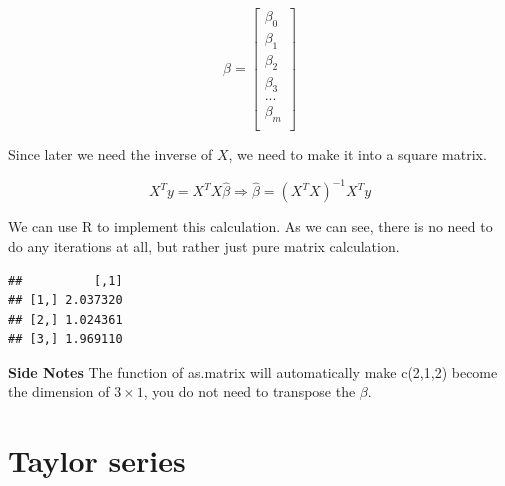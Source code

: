\documentclass[]{book}
\newenvironment{Shaded}{\begin{snugshade}}{\end{snugshade}}
\newcommand{\CommentTok}[1]{\textcolor[rgb]{0.56,0.35,0.01}{\textit{#1}}}
\newcommand{\DataTypeTok}[1]{\textcolor[rgb]{0.13,0.29,0.53}{#1}}
\newcommand{\DecValTok}[1]{\textcolor[rgb]{0.00,0.00,0.81}{#1}}
\newcommand{\KeywordTok}[1]{\textcolor[rgb]{0.13,0.29,0.53}{\textbf{#1}}}
\newcommand{\NormalTok}[1]{#1}
\newcommand{\OperatorTok}[1]{\textcolor[rgb]{0.81,0.36,0.00}{\textbf{#1}}}
\begin{document}
\[\beta = \begin{bmatrix}\beta_0 \\
\beta_1 \\
\beta_2 \\
\beta_3 \\
...\\
\beta_m \\
\end{bmatrix}\]

Since later we need the inverse of \(X\), we need to make it into a square matrix.

\[X^Ty=X^TX \hat{\beta} \Rightarrow \hat{\beta} = (X^TX)^{-1} X^Ty\]

We can use R to implement this calculation. As we can see, there is no need to do any iterations at all, but rather just pure matrix calculation.

\begin{Shaded}
\end{Shaded}

\begin{verbatim}
##          [,1]
## [1,] 2.037320
## [2,] 1.024361
## [3,] 1.969110
\end{verbatim}

\textbf{Side Notes}
The function of as.matrix will automatically make c(2,1,2) become the dimension of \(3 \times 1\), you do not need to transpose the \(\beta\).

\hypertarget{taylor-series}{%
\section{Taylor series}\label{taylor-series}}
\end{document}
